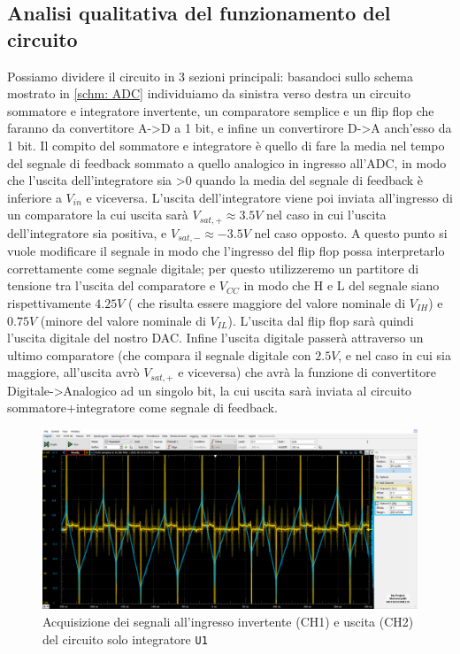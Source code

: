 \documentclass[10pt, a4paper, italian]{article}
\begin{document}
\subsection{Analisi qualitativa del funzionamento del circuito}
Possiamo dividere il circuito in 3 sezioni principali: basandoci sullo schema mostrato in \cref{schm: ADC} individuiamo da sinistra verso destra un circuito sommatore e integratore invertente, un comparatore semplice e un flip flop che faranno da convertitore A->D a 1 bit, e infine un convertirore D->A anch'esso da 1 bit.
Il compito del sommatore e integratore è quello di fare la media nel tempo del segnale di feedback sommato a quello analogico in ingresso all'ADC, in modo che l'uscita dell'integratore sia >0 quando la media del segnale di feedback è inferiore a $V_{in}$ e viceversa.
L'uscita dell'integratore viene poi inviata all'ingresso di un comparatore la cui uscita sarà $V_{sat,+} \approx 3.5 V$ nel caso in cui l'uscita dell'integratore sia positiva, e $V_{sat,-} \approx -3.5 V$ nel caso opposto.
A questo punto si vuole modificare il segnale in modo che l'ingresso del flip flop possa interpretarlo correttamente come segnale digitale; per questo utilizzeremo un partitore di tensione tra l'uscita del comparatore e $V_{CC}$ in modo che H e L del segnale siano rispettivamente $4.25 V$ ( che risulta essere maggiore del valore nominale di $V_{IH}$) e $0.75 V$ (minore del valore nominale di $V_{IL}$).
L'uscita dal flip flop sarà quindi l'uscita digitale del nostro DAC.
Infine l'uscita digitale passerà attraverso un ultimo comparatore (che compara il segnale digitale con $2.5V$, e nel caso in cui sia maggiore, all'uscita avrò $V_{sat,+}$ e viceversa) che avrà la funzione di convertitore Digitale->Analogico ad un singolo bit, la cui uscita sarà inviata al circuito sommatore+integratore come segnale di feedback.
\begin{figure}[htbp]
    \centering
	\includegraphics[width=\textwidth]{MIDDLE.U1.InputVSOutput}
    \caption{Acquisizione dei segnali all'ingresso invertente (CH1) e uscita (CH2)
    del circuito solo integratore \texttt{U1}}
\end{figure}
\end{document}
